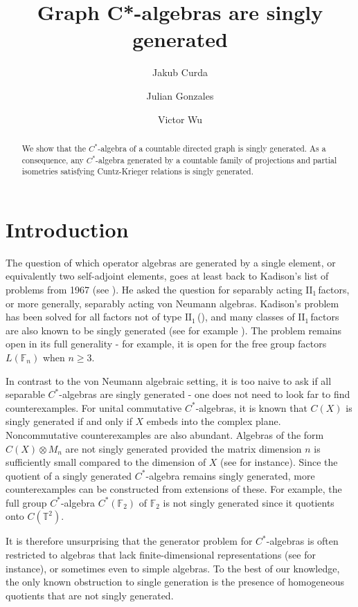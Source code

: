 \documentclass[12pt, a4paper]
{amsart}
\title{Graph C*-algebras are singly generated}
\author[Curda]{Jakub Curda}
\author[Gonzales]{Julian Gonzales}
\author[Wu]{Victor Wu}
\theoremstyle{definition}
\theoremstyle{remark}
\numberwithin{equation}{section}
\newcommand{\Cstar}{\ensuremath{C^*}}
\newcommand{\twoone}{\ensuremath{\mathrm{II}_{1}\,}}
\newcommand{\bT}{\ensuremath{\mathbb{T}}}
\newcommand{\bF}{\ensuremath{\mathbb{F}}}
\begin{document}
\maketitle

\begin{abstract}
    We show that the $C^*$-algebra of a countable directed graph is singly generated. As a consequence, any $C^*$-algebra generated by a countable family of projections and partial isometries satisfying Cuntz-Krieger relations is singly generated.
\end{abstract}

\section*{Introduction}

The question of which operator algebras are generated by a single element, or equivalently two self-adjoint elements, goes at least back to Kadison's list of problems from 1967 (see \cite{Ge03}). He asked the question for separably acting \twoone factors, or more generally, separably acting von Neumann algebras. Kadison's problem has been solved for all factors not of type \twoone (\cite{Pearcy62,Wogen69}), and many classes of \twoone factors are also known to be singly generated (see for example \cite{Popa85,GePopa98,Sri}). The problem remains open in its full generality - for example, it is open for the free group factors $L(\bF_n)$ when $n\geq3$.

In contrast to the von Neumann algebraic setting, it is too naive to ask if all separable \Cstar-algebras are singly generated - one does not need to look far to find counterexamples. For unital commutative \Cstar-algebras, it is known that $C(X)$ is singly generated if and only if $X$ embeds into the complex plane. Noncommutative counterexamples are also abundant. Algebras of the form $C(X)\otimes M_n$ are not singly generated provided the matrix dimension $n$ is sufficiently small compared to the dimension of $X$ (see \cite{Nagisa04} for instance). Since the quotient of a singly generated \Cstar-algebra remains singly generated,  more counterexamples can be constructed from extensions of these. For example, the full group \Cstar-algebra $\Cstar(\bF_2)$ of $\bF_2$ is not singly generated since it quotients onto $C(\bT^2)$.

It is therefore unsurprising that the generator problem for \Cstar-algebras is often restricted to algebras that lack finite-dimensional representations (see \cite[Question~1.3]{TW14} for instance), or sometimes even to simple algebras. To the best of our knowledge, the only known obstruction to single generation is the presence of homogeneous quotients that are not singly generated.
\end{document}
